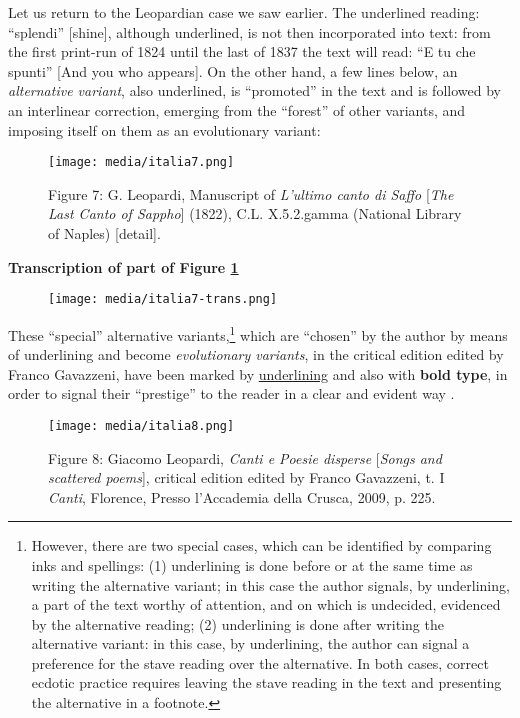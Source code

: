 \documentclass{article}
\begin{document}
Let us return to the Leopardian case we saw earlier. The underlined
reading: ``splendi'' [shine], although underlined, is not then
incorporated into text: from the first print-run of 1824 until the last
of 1837 the text will read: ``E tu che spunti'' [And you who appears].
On the other hand, a few lines below, an \emph{alternative variant},
also underlined, is ``promoted'' in the text and is followed by an
interlinear correction, emerging from the ``forest'' of other variants,
and imposing itself on them as an evolutionary variant:

\begin{figure}[H]
    \centering
    \texttt{[image: media/italia7.png]}
    \caption{Figure 7: G. Leopardi, Manuscript of \emph{L'ultimo canto di Saffo}
[\emph{The Last Canto of Sappho}] (1822), C.L. X.5.2.gamma (National
Library of Naples) {[}detail{]}.}
    \label{fig:italia7}
\end{figure}

\textbf{Transcription of part of Figure \ref{fig:italia7}}

\begin{figure}
    \centering
    \texttt{[image: media/italia7-trans.png]}
\end{figure}

These ``special'' alternative variants,\footnote{However, there are two
  special cases, which can be identified by comparing inks and
  spellings: (1) underlining is done before or at the same time as
  writing the alternative variant; in this case the author signals, by
  underlining, a part of the text worthy of attention, and on which is
  undecided, evidenced by the alternative reading; (2) underlining is
  done after writing the alternative variant: in this case, by
  underlining, the author can signal a preference for the stave reading
  over the alternative. In both cases, correct ecdotic practice requires
  leaving the stave reading in the text and presenting the alternative
  in a footnote.} which are ``chosen'' by the author by means of
underlining and become \emph{evolutionary variants}, in the critical
edition edited by Franco Gavazzeni, have been marked by
\uline{underlining} and also with \textbf{bold type}, in order to signal
their ``prestige'' to the reader in a clear and evident way \parencite{leopardi_canti_2009}.


\begin{figure}[H]
    \centering
    \texttt{[image: media/italia8.png]}
    \caption{Figure 8: Giacomo Leopardi, \textit{Canti e Poesie disperse} [\textit{Songs and scattered poems}], critical edition edited by Franco Gavazzeni, t. I \textit{Canti}, Florence, Presso l'Accademia della Crusca, 2009, p. 225.}
    \label{fig:italia8}
\end{figure}
\end{document}
